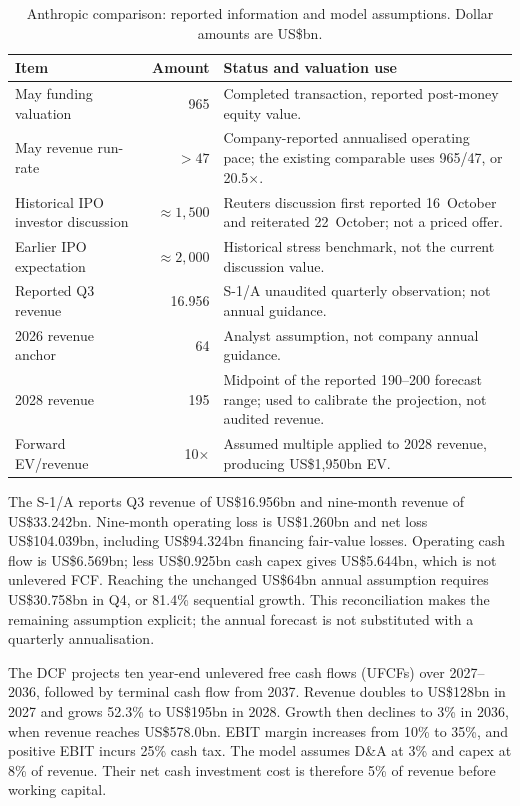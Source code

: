 \documentclass[11pt]{article}
\begin{document}
\begin{table}[H]
\centering
\small
\caption{Anthropic comparison: reported information and model assumptions. Dollar amounts are US\$bn.}
\label{tab:anthropicstatus}
\begin{tabular}{p{3.4cm}rp{8.0cm}}
\toprule
Item & Amount & Status and valuation use \\
\midrule
May funding valuation & 965 & Completed transaction, reported post-money equity value. \\
May revenue run-rate & $>47$ & Company-reported annualised operating pace; the existing comparable uses 965/47, or 20.5$\times$. \\
Historical IPO investor discussion & $\approx1{,}500$ & Reuters discussion first reported 16~October and reiterated 22~October; not a priced offer. \\
Earlier IPO expectation & $\approx2{,}000$ & Historical stress benchmark, not the current discussion value. \\
Reported Q3 revenue & 16.956 & S-1/A unaudited quarterly observation; not annual guidance. \\
2026 revenue anchor & 64 & Analyst assumption, not company annual guidance. \\
2028 revenue & 195 & Midpoint of the reported 190--200 forecast range; used to calibrate the projection, not audited revenue. \\
Forward EV/revenue & 10$\times$ & Assumed multiple applied to 2028 revenue, producing US\$1{,}950bn EV. \\
\bottomrule
\end{tabular}
\end{table}

The S-1/A reports Q3 revenue of US\$16.956bn and nine-month revenue of US\$33.242bn. Nine-month operating loss is US\$1.260bn and net loss US\$104.039bn, including US\$94.324bn financing fair-value losses. Operating cash flow is US\$6.569bn; less US\$0.925bn cash capex gives US\$5.644bn, which is not unlevered FCF. Reaching the unchanged US\$64bn annual assumption requires US\$30.758bn in Q4, or 81.4\% sequential growth. This reconciliation makes the remaining assumption explicit; the annual forecast is not substituted with a quarterly annualisation.

The DCF projects ten year-end unlevered free cash flows (UFCFs) over 2027--2036, followed by terminal cash flow from 2037. Revenue doubles to US\$128bn in 2027 and grows 52.3\% to US\$195bn in 2028. Growth then declines to 3\% in 2036, when revenue reaches US\$578.0bn. EBIT margin increases from 10\% to 35\%, and positive EBIT incurs 25\% cash tax. The model assumes D\&A at 3\% and capex at 8\% of revenue. Their net cash investment cost is therefore 5\% of revenue before working capital.
\end{document}
